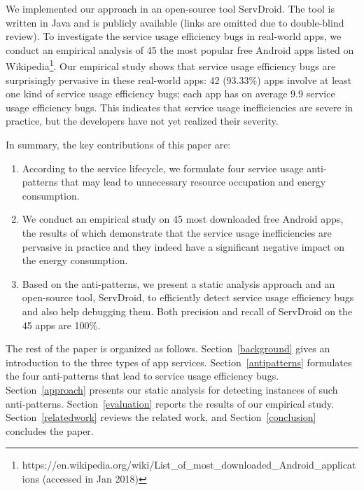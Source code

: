 \documentclass[conference]{IEEEtran}
\begin{document}
We implemented our approach in an open-source tool \textsf{ServDroid}. The tool
is written in Java and is publicly available (links are omitted due to double-blind review).
To investigate the service usage efficiency bugs in real-world apps, we conduct an empirical analysis of 45 the most popular free Android apps listed on
Wikipedia\footnote{https://en.wikipedia.org/wiki/List\_of\_most\_downloaded\_Android\_applications (accessed in Jan 2018)}.
Our empirical study shows that
service usage efficiency bugs are surprisingly pervasive in these real-world apps: 42 (93.33\%) apps involve at least one kind of service usage
efficiency bugs; each app has on average 9.9 service usage efficiency bugs.
This indicates that service usage inefficiencies are
severe in practice, but the developers have not yet realized their severity.


In summary, the key contributions of this paper are:
\begin{enumerate}
\item According to the service lifecycle, we formulate four service usage
anti-patterns that may lead to unnecessary resource occupation and energy consumption.
\item We conduct an empirical study on 45 most downloaded free Android apps, the results of which demonstrate that the service usage inefficiencies are pervasive in practice and they indeed have a significant negative impact on the energy consumption.
\item Based on the anti-patterns, we present a static analysis approach and an open-source tool, \textsf{ServDroid}, to efficiently detect service usage efficiency bugs and also help debugging them. Both precision and recall of \textsf{ServDroid} on the 45 apps are 100\%.
\end{enumerate}

The rest of the paper is organized as follows. Section~\ref{background} gives an
introduction to the three types of app services.
Section~\ref{antipatterns} formulates the four anti-patterns that lead to
service usage efficiency bugs.
Section~\ref{approach} presents our static analysis for detecting instances
of such anti-patterns.
Section~\ref{evaluation} reports the results of our empirical study.
Section~\ref{relatedwork} reviews the related work, and
Section~\ref{conclusion} concludes the paper.
\end{document}
